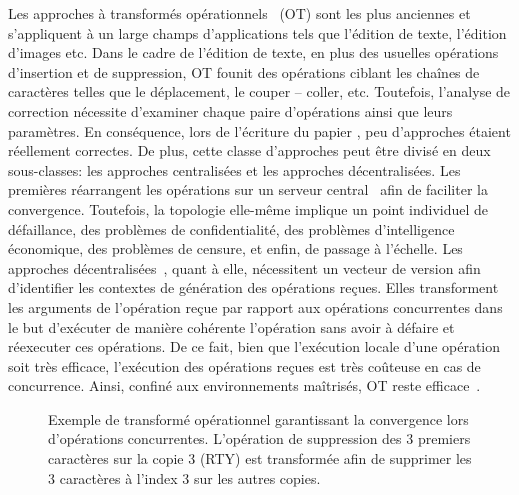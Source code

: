 Les approches à transformés opérationnels~\cite{sun1998operational,
  sun2009contextbased} (OT) sont les plus anciennes et s'appliquent à un large
champs d'applications tels que l'édition de texte, l'édition d'images etc. Dans
le cadre de l'édition de texte, en plus des usuelles opérations d'insertion et
de suppression, OT founit des opérations ciblant les chaînes de caractères
telles que le déplacement, le couper -- coller, etc. Toutefois, l'analyse de
correction nécessite d'examiner chaque paire d'opérations ainsi que leurs
paramètres. En conséquence, lors de l'écriture du papier
\cite{imine2003proving}, peu d'approches étaient réellement correctes. De plus,
cette classe d'approches peut être divisé en deux sous-classes: les approches
centralisées et les approches décentralisées. Les premières réarrangent les
opérations sur un serveur central~\cite{nichols1995high} afin de faciliter la
convergence. Toutefois, la topologie elle-même implique un point individuel de
défaillance, des problèmes de confidentialité, des problèmes d'intelligence
économique, des problèmes de censure, et enfin, de passage à l'échelle. Les
approches décentralisées~\cite{sun2009contextbased}, quant à elle, nécessitent
un vecteur de version afin d'identifier les contextes de génération des
opérations reçues. Elles transforment les arguments de l'opération reçue par
rapport aux opérations concurrentes dans le but d'exécuter de manière cohérente
l'opération sans avoir à défaire et réexecuter ces opérations. De ce fait, bien
que l'exécution locale d'une opération soit très efficace, l'exécution des
opérations reçues est très coûteuse en cas de concurrence. Ainsi, confiné aux
environnements maîtrisés, OT reste efficace~\cite{mehdi2014merging}.

\begin{figure}
  \centering
  
  \caption{\label{lseq:fig:otexample}Exemple de transformé opérationnel
    garantissant la convergence lors d'opérations concurrentes. L'opération de
    suppression des 3 premiers caractères sur la copie 3 (RTY) est transformée
    afin de supprimer les 3 caractères à l'index 3 sur les autres copies.}
\end{figure}

